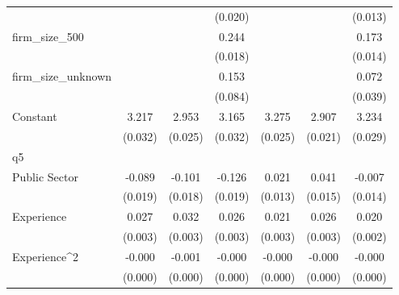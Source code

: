{\begin{tabular}{l*{6}{c}}
                    &                     &                     &     (0.020)         &                     &                     &     (0.013)         \\
firm\_size\_500       &                     &                     &       0.244\sym{***}&                     &                     &       0.173\sym{***}\\
                    &                     &                     &     (0.018)         &                     &                     &     (0.014)         \\
firm\_size\_unknown   &                     &                     &       0.153\sym{*}  &                     &                     &       0.072\sym{*}  \\
                    &                     &                     &     (0.084)         &                     &                     &     (0.039)         \\
Constant            &       3.217\sym{***}&       2.953\sym{***}&       3.165\sym{***}&       3.275\sym{***}&       2.907\sym{***}&       3.234\sym{***}\\
                    &     (0.032)         &     (0.025)         &     (0.032)         &     (0.025)         &     (0.021)         &     (0.029)         \\
\hline
q5                  &                     &                     &                     &                     &                     &                     \\
Public Sector       &      -0.089\sym{***}&      -0.101\sym{***}&      -0.126\sym{***}&       0.021\sym{*}  &       0.041\sym{***}&      -0.007         \\
                    &     (0.019)         &     (0.018)         &     (0.019)         &     (0.013)         &     (0.015)         &     (0.014)         \\
Experience          &       0.027\sym{***}&       0.032\sym{***}&       0.026\sym{***}&       0.021\sym{***}&       0.026\sym{***}&       0.020\sym{***}\\
                    &     (0.003)         &     (0.003)         &     (0.003)         &     (0.003)         &     (0.003)         &     (0.002)         \\
Experience^{2}      &      -0.000\sym{***}&      -0.001\sym{***}&      -0.000\sym{***}&      -0.000\sym{***}&      -0.000\sym{***}&      -0.000\sym{***}\\
                    &     (0.000)         &     (0.000)         &     (0.000)         &     (0.000)         &     (0.000)         &     (0.000)         \\

\end{tabular}}
